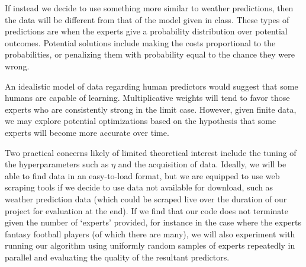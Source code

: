 \documentclass{pset}
\begin{document}
If instead we decide to use something more similar to weather predictions, then the data will be different from that of the model given in class. These types of predictions are when the experts give a probability distribution over potential outcomes. Potential solutions include making the costs proportional to the probabilities, or penalizing them with probability equal to the chance they were wrong.

An idealistic model of data regarding human predictors would suggest that some humans are capable of learning.
Multiplicative weights will tend to favor those experts who are consistently strong in the limit case.
However, given finite data, we may explore potential optimizations based on the hypothesis that some experts will become more accurate over time.

Two practical concerns likely of limited theoretical interest include the tuning of the hyperparameters such as \(\eta\) and the acquisition of data.
Ideally, we will be able to find data in an easy-to-load format, but we are equipped to use web scraping tools if we decide to use data not available for download, such as weather prediction data (which could be scraped live over the duration of our project for evaluation at the end).
If we find that our code does not terminate given the number of `experts' provided, for instance in the case where the experts fantasy football players (of which there are many), we will also experiment with running our algorithm using uniformly random samples of experts repeatedly in parallel and evaluating the quality of the resultant predictors.
\end{document}
